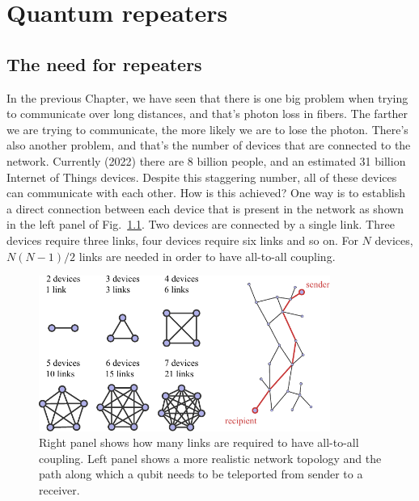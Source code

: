 \chapter{Quantum repeaters}
\label{sec:12_quantum_repeaters}
\label{ch:repeaters}

\section{The need for repeaters}
\label{sec:12-1_need_for_repeaters}

In the previous Chapter, we have seen that there is one big problem when trying to communicate over long distances, and that's photon loss in fibers.
The farther we are trying to communicate, the more likely we are to lose the photon.
There's also another problem, and that's the number of devices that are connected to the network. Currently (2022) there are 8 billion people, and an estimated 31 billion Internet of Things devices.
Despite this staggering number, all of these devices can communicate with each other.
How is this achieved?
One way is to establish a direct connection between each device that is present in the network as shown in the left panel of Fig.~\ref{fig:12-1_all_to_all}.
Two devices are connected by a single link.
Three devices require three links, four devices require six links and so on.
For $N$ devices, $N (N - 1) / 2$ links are needed in order to have all-to-all coupling.

\begin{figure}[t]
    \centering
    \includegraphics[width=0.85\textwidth]{lesson12/12-1_all_to_all.pdf}
    \caption[All-to-all coupling]{Right panel shows how many links are required to have all-to-all coupling. Left panel shows a more realistic network topology and the path along which a qubit needs to be teleported from sender to a receiver.}
    \label{fig:12-1_all_to_all}
\end{figure}

